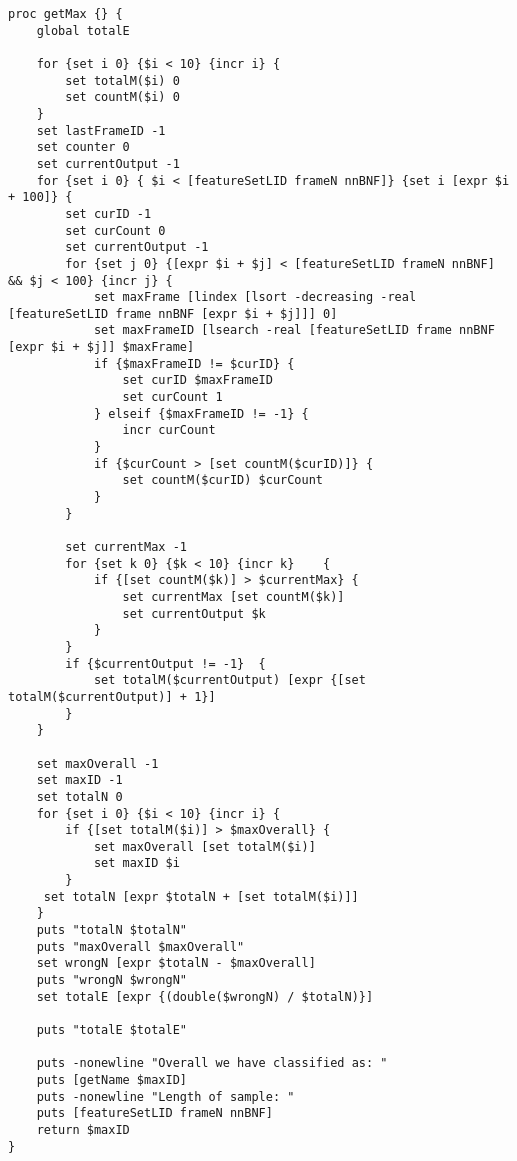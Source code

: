 \begin{lstlisting}[label=lst:SequenceFilter,caption=Sequence Filter employed to smooth/improve output]
proc getMax {} {
    global totalE

    for {set i 0} {$i < 10} {incr i} {
        set totalM($i) 0
        set countM($i) 0
    }
    set lastFrameID -1
    set counter 0
    set currentOutput -1
    for {set i 0} { $i < [featureSetLID frameN nnBNF]} {set i [expr $i + 100]} {
        set curID -1
        set curCount 0
        set currentOutput -1
        for {set j 0} {[expr $i + $j] < [featureSetLID frameN nnBNF] && $j < 100} {incr j} {
            set maxFrame [lindex [lsort -decreasing -real [featureSetLID frame nnBNF [expr $i + $j]]] 0]
            set maxFrameID [lsearch -real [featureSetLID frame nnBNF [expr $i + $j]] $maxFrame]
            if {$maxFrameID != $curID} {
                set curID $maxFrameID
                set curCount 1
            } elseif {$maxFrameID != -1} {
                incr curCount
            }
            if {$curCount > [set countM($curID)]} {
                set countM($curID) $curCount
            }
        }

        set currentMax -1
        for {set k 0} {$k < 10} {incr k}    {
            if {[set countM($k)] > $currentMax} {
                set currentMax [set countM($k)]
                set currentOutput $k
            }
        }
        if {$currentOutput != -1}  {
            set totalM($currentOutput) [expr {[set totalM($currentOutput)] + 1}]
        }
    }

    set maxOverall -1
    set maxID -1
    set totalN 0
    for {set i 0} {$i < 10} {incr i} {
        if {[set totalM($i)] > $maxOverall} {
            set maxOverall [set totalM($i)]
            set maxID $i
        }
     set totalN [expr $totalN + [set totalM($i)]]
    }
    puts "totalN $totalN"
    puts "maxOverall $maxOverall"
    set wrongN [expr $totalN - $maxOverall]
    puts "wrongN $wrongN"
    set totalE [expr {(double($wrongN) / $totalN)}]

    puts "totalE $totalE"

    puts -nonewline "Overall we have classified as: "
    puts [getName $maxID]
    puts -nonewline "Length of sample: "
    puts [featureSetLID frameN nnBNF]
    return $maxID
}
\end{lstlisting}